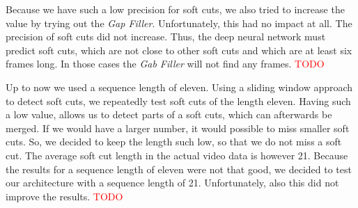 Because we have such a low precision for soft cuts, we also tried to increase the value by trying out the \textit{Gap Filler}.
Unfortunately, this had no impact at all.
The precision of soft cuts did not increase.
Thus, the deep neural network must predict soft cuts, which are not close to other soft cuts and which are at least six frames long.
In those cases the \textit{Gab Filler} will not find any frames.
\textcolor{red}{TODO}

Up to now we used a sequence length of eleven.
Using a sliding window approach to detect soft cuts, we repeatedly test soft cuts of the length eleven.
Having such a low value, allows us to detect parts of a soft cuts, which can afterwards be merged.
If we would have a larger number, it would possible to miss smaller soft cuts.
So, we decided to keep the length such low, so that we do not miss a soft cut.
The average soft cut length in the actual video data is however 21.
Because the results for a sequence length of eleven were not that good, we decided to test our architecture with a sequence length of 21.
Unfortunately, also this did not improve the results.
\textcolor{red}{TODO} %
